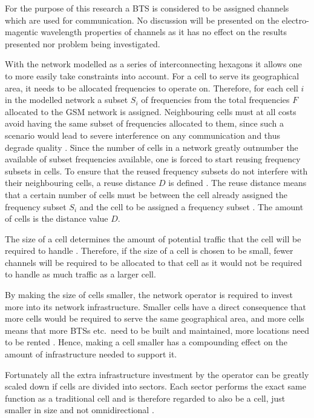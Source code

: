 For the purpose of this research a BTS is considered to be assigned channels which are used for communication. No discussion will be presented on the electro-magentic wavelength properties of channels as it has no effect on the results presented nor problem being investigated.

With the network modelled as a series of interconnecting hexagons it allows one to more easily take constraints into account. For a cell to serve its geographical area, it needs to be allocated frequencies to operate on. Therefore, for each cell $i$ in the modelled network a subset $S_i$ of frequencies from the total frequencies $F$ allocated to the GSM network is assigned\cite{GSMArchitectureProtocolsServices}. Neighbouring cells must at all costs avoid having the same subset of frequencies allocated to them, since such a scenario would lead to severe interference on any communication and thus degrade quality \cite{GSMArchitectureProtocolsServices}.
Since the number of cells in a network greatly outnumber the available of subset frequencies available, one is forced to start reusing frequency subsets in cells. To ensure that the reused frequency subsets do not interfere with their neighbouring cells, a reuse distance $D$ is defined \cite{GSMArchitectureProtocolsServices}. The reuse distance means that a certain number of cells must be between the cell already assigned the frequency subset $S_i$ and the cell to be assigned a frequency subset \cite{GSMArchitectureProtocolsServices}. The amount of cells is the distance value $D$.

The size of a cell determines the amount of potential traffic that the cell will be required to handle \cite{GSM92,Eisenblatter,GSMArchitectureProtocolsServices}. Therefore, if the size of a cell is chosen to be small, fewer channels will be required to be allocated to that cell as it would not be required to handle as much traffic as a larger cell. 

By making the size of cells smaller, the network operator is required to invest more into its network infrastructure. Smaller cells have a direct consequence that more cells would be required to serve the same geographical area, and more cells means that more BTSs etc.\ need to be built and maintained, more locations need to be rented \cite{GSMArchitectureProtocolsServices}. Hence, making a cell smaller has a compounding effect on the amount of infrastructure needed to support it.

Fortunately all the extra infrastructure investment by the operator can be greatly scaled down if cells are divided into sectors\label{def:cellsector}. Each sector performs the exact same function as a traditional cell and is therefore regarded to also be a cell, just smaller in size and not omnidirectional \cite{GSMArchitectureProtocolsServices,GSM92,GSMSysEngin}. 

